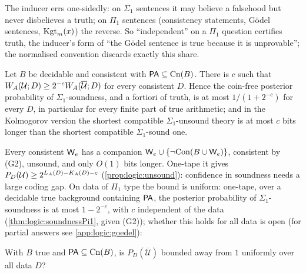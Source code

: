 The inducer errs one-sidedly: on $\Sigma_1$ sentences it may believe a falsehood but never disbelieves a truth; on $\Pi_1$ sentences (consistency statements, Gödel sentences, $\mathrm{Kgt}_m(x)$) the reverse. So ``independent'' on a $\Pi_1$ question certifies truth, the inducer's form of ``the Gödel sentence is true because it is unprovable''; the normalised convention discards exactly this share.

\begin{theorem}\label{thm:logic:soundness}
Let $B$ be decidable and consistent with $\mathsf{PA}\subseteq\mathrm{Cn}(B)$. There is $c$ such that $W_{A}(\mathcal U;D)\ge2^{-c}W_{A}(\overline{\mathcal U};D)$ for every consistent $D$. Hence the coin-free posterior probability of $\Sigma_1$-soundness, and a fortiori of truth, is at most $1/(1+2^{-c})$ for every $D$, in particular for every finite part of true arithmetic; and in the Kolmogorov version the shortest compatible $\Sigma_1$-unsound theory is at most $c$ bits longer than the shortest compatible $\Sigma_1$-sound one.
\end{theorem}

Every consistent $\mathsf{W}_{e}$ has a companion $\mathsf{W}_{e}\cup\{\neg\mathrm{Con}(B\cup\mathsf{W}_{e})\}$, consistent by (G2), unsound, and only $O(1)$ bits longer. One-tape it gives $P_D(\mathcal U)\ge2^{L_{A}(D)-K_{A}(D)-c}$ (\cref{prop:logic:unsound}): confidence in soundness needs a large coding gap. On data of $\Pi_1$ type the bound is uniform: one-tape, over a decidable true background containing $\mathsf{PA}$, the posterior probability of $\Sigma_1$-soundness is at most $1-2^{-c}$, with $c$ independent of the data (\cref{thm:logic:soundnessPi1}, given (G2)); whether this holds for all data is open (for partial answers see \cref{app:logic:goedel}):

\begin{question}\label{q:logic:soundness}
With $B$ true and $\mathsf{PA}\subseteq\mathrm{Cn}(B)$, is $P_D(\overline{\mathcal U})$ bounded away from $1$ uniformly over all data $D$?
\end{question}

